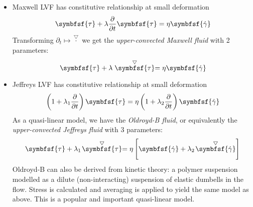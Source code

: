 \documentclass{jknotes}
\newcommand{\ucd}[1]{\stackrel{\bigtriangledown}{#1}}
\begin{document}
\begin{eg}
	\begin{itemize}
		\item Maxwell LVF has constitutive relationship at small deformation
			\begin{equation}
				\symbfsf{\tau} + \lambda \frac{\partial}{\partial t}
				\symbfsf{\tau} = \eta \symbfsf{\srate}
			\end{equation}
			Transforming $\partial_t \mapsto \ucd{\cdot}$ we get the
			\emph{upper-convected Maxwell fluid} with 2 parameters:
			\begin{equation}
				\symbfsf{\tau} + \lambda \ucd{\symbfsf{\tau}}
				 = \eta \symbfsf{\srate}
			\end{equation}
		\item Jeffreys LVF has constitutive relationship at small deformation
			\begin{equation}
				\left( 1 + \lambda_1\frac{\partial}{\partial
				t}\right) \symbfsf{\tau}=
				\eta \left( 1 + \lambda_2 \frac{\partial}{\partial t} \right)
				\symbfsf{\srate}
			\end{equation}
			As a quasi-linear model, we have the \emph{Oldroyd-B fluid}, or
			equivalently the \emph{upper-convected Jeffreys fluid} with 3
			parameters:
			\begin{equation}
				\symbfsf{\tau} + \lambda_1\!\ucd{\symbfsf{\tau}} = \eta \left[
				\symbfsf{\srate} + \lambda_2\!\ucd{\symbfsf{\srate}}\right]
			\end{equation}
			Oldroyd-B can also be derived from kinetic theory: a polymer
			suspension modelled as a dilute (non-interacting) suspension of
			elastic dumbells in the flow. Stress is calculated and averaging is
			applied to yield the same model as above. This is a popular and
			important quasi-linear model.
			\begin{center}
			\end{center}
	\end{itemize}
\end{eg}
\end{document}
